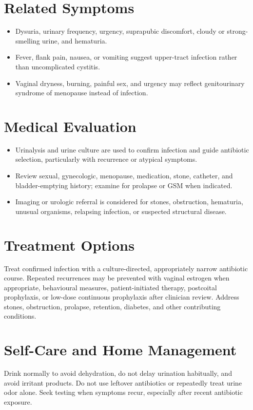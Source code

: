 \section*{Related Symptoms}
\begin{itemize}
  \item Dysuria, urinary frequency, urgency, suprapubic discomfort, cloudy or strong-smelling urine, and hematuria.
  \item Fever, flank pain, nausea, or vomiting suggest upper-tract infection rather than uncomplicated cystitis.
  \item Vaginal dryness, burning, painful sex, and urgency may reflect genitourinary syndrome of menopause instead of infection.
\end{itemize}

\section*{Medical Evaluation}
\begin{itemize}
  \item Urinalysis and urine culture are used to confirm infection and guide antibiotic selection, particularly with recurrence or atypical symptoms.
  \item Review sexual, gynecologic, menopause, medication, stone, catheter, and bladder-emptying history; examine for prolapse or GSM when indicated.
  \item Imaging or urologic referral is considered for stones, obstruction, hematuria, unusual organisms, relapsing infection, or suspected structural disease.
\end{itemize}

\section*{Treatment Options}
Treat confirmed infection with a culture-directed, appropriately narrow antibiotic course. Repeated recurrences may be prevented with vaginal estrogen when appropriate, behavioural measures, patient-initiated therapy, postcoital prophylaxis, or low-dose continuous prophylaxis after clinician review. Address stones, obstruction, prolapse, retention, diabetes, and other contributing conditions.

\section*{Self-Care and Home Management}
Drink normally to avoid dehydration, do not delay urination habitually, and avoid irritant products. Do not use leftover antibiotics or repeatedly treat urine odor alone. Seek testing when symptoms recur, especially after recent antibiotic exposure.

